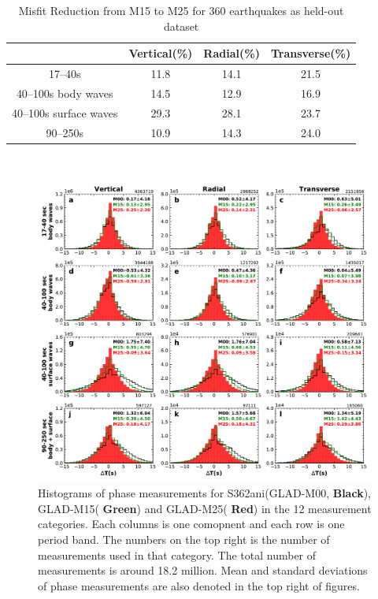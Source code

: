 \documentclass[extra,mreferee]{gji}
\begin{document}
\begin{table}[!htb]
  \centering
  \caption{Misfit Reduction from M15 to M25 for 360 earthquakes as held-out dataset}
  \label{tab:category}
  \begin{tabular}{|c|c|c|c|}
  \hline
  ~          &  Vertical(\%) & Radial(\%) &  Transverse(\%) \\
  \hline
  17--40s                &          11.8 &       14.1 &       21.5 \\
  40--100s body waves    &          14.5 &       12.9 &       16.9 \\
  40--100s surface waves &          29.3 &       28.1 &       23.7 \\
  90--250s               &          10.9 &       14.3 &       24.0 \\
  \hline
  \end{tabular}\\
  \label{table:misfit_reduction_M15_M25_360}
\end{table}


\begin{figure}
  \centering
  \includegraphics[width=\textwidth]{figures/dt_histogram.pdf}
  \caption{Histograms of phase measurements for S362ani(GLAD-M00, \textbf{Black}), GLAD-M15(\textbf{{\color{ForestGreen} Green}}) and GLAD-M25(\textbf{{\color{Red} Red}}) in the 12 measurement categories. Each columns is one comopnent and each row is one period band. The numbers on the top right is the number of measurements used in that category. The total number of measurements is around 18.2 million. Mean and standard deviations of phase measurements are also denoted in the top right of figures.}
  \label{fig:phase_hist}
\end{figure}
\end{document}
